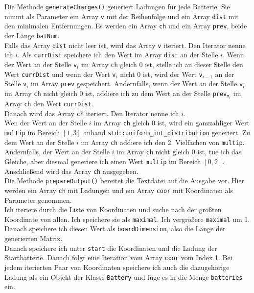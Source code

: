\documentclass[a4paper,10pt,ngerman]{scrartcl}
\begin{document}
Die Methode \texttt{generateCharges()} generiert Ladungen für jede Batterie. Sie nimmt als Parameter ein
Array \texttt{v} mit der Reihenfolge und ein Array \texttt{dist} mit den minimalen Entfernungen.
Es werden ein Array \texttt{ch} und ein Array \texttt{prev}, beide der Länge \texttt{batNum}.\\
Falls das Array \texttt{dist} nicht leer ist, wird das Array \texttt{v} iteriert. Den Iterator nenne ich $i$.
Als \texttt{currDist} speichere ich den Wert im Array \texttt{dist} an der Stelle $i$.
Wenn der Wert an der Stelle \texttt{v}$_i$ im Array \texttt{ch} gleich 0 ist, stelle ich an dieser Stelle den Wert \texttt{currDist}
und wenn der Wert \texttt{v}$_i$ nicht 0 ist, wird der Wert \texttt{v}$_{i-1}$ an der Stelle \texttt{v}$_i$ im Array \texttt{prev}
gespeichert.
Andernfalls, wenn der Wert an der Stelle \texttt{v}$_i$ im Array \texttt{ch} nicht gleich 0 ist, addiere ich
zu dem Wert an der Stelle \texttt{prev}$_{\texttt{v}_i}$ im Array \texttt{ch} den Wert \texttt{currDist}.\\
Danach wird das Array \texttt{ch} iteriert. Den Iterator nenne ich $i$.\\
Wen der Wert an der Stelle $i$ im Array \texttt{ch} gleich 0 ist, wird ein ganzzahliger Wert \texttt{multip} im Bereich $[1,3]$ anhand 
\texttt{std::uniform\_int\_distribution} generiert. Zu dem Wert an der Stelle $i$ im Array \texttt{ch} addiere ich den 2. Vielfachen 
von \texttt{multip}.
Andernfalls, der Wert an der Stelle $i$ im Array \texttt{ch} nicht gleich 0 ist, tue ich das Gleiche, aber diesmal generiere
ich einen Wert \texttt{multip} im Bereich $[0,2]$.\\
Anschließend wird das Array \texttt{ch} ausgegeben.\\

Die Methode \texttt{prepareOutput()} bereitet die Textdatei auf die Ausgabe vor.
Hier werden ein Array \texttt{ch} mit Ladungen und ein Array \texttt{coor} mit Koordinaten als Parameter genommen.\\
Ich iteriere durch die Liste von Koordinaten und suche nach der größten Koordinate von allen. Ich speichere sie als
\texttt{maximal}. Ich vergrößere \texttt{maximal} um 1. Danach speichere ich diesen Wert als \texttt{boardDimension},
also die Länge der generierten Matrix.\\
Danach speichere ich unter \texttt{start} die Koordinaten und die Ladung der Startbatterie.
Danach folgt eine Iteration vom Array \texttt{coor} vom Index 1. 
Bei jedem iterierten Paar von Koordinaten speichere ich auch die dazugehörige Ladung als ein Objekt der Klasse \texttt{Battery}
und füge es in die Menge \texttt{batteries} ein.\\
\end{document}
